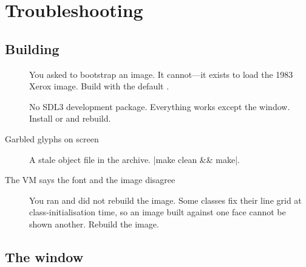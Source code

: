 \chapter{Troubleshooting}
\label{app:trouble}

\section{Building}

\begin{description}
\item[] You asked
   to bootstrap an image. It cannot---it exists to load the 1983
  Xerox image. Build with the default .
\item[] No SDL3 development package.
  Everything works except the window. Install  or
   and rebuild.
\item[Garbled glyphs on screen] A stale object file in the archive.
  \ct|make clean && make|.
\item[The VM says the font and the image disagree] You ran  and
  did not rebuild the image. Some classes fix their line grid at
  class-initialisation time, so an image built against one face cannot be shown
  another. Rebuild the image.
\end{description}

\section{The window}


